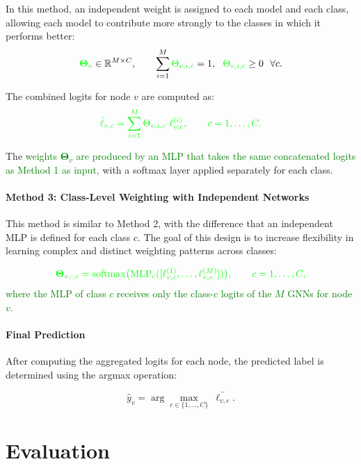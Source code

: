 \documentclass[a4paper,fleqn]{cas-sc}
\newcommand{\revthree}[1]{\textcolor{green}{#1}} %
\begin{document}
In this method, an independent weight is assigned to each model and each class, allowing each model to contribute more strongly to the classes in which it performs better:
\begin{equation}
\revthree{\mathbf{\Theta}_v}\in\mathbb{R}^{M\times C}, \qquad
\sum_{i=1}^{M}\revthree{\Theta_{v,i,c}}=1,\ \ \revthree{\Theta_{v,i,c}}\ge 0 \ \ \forall c.
\end{equation}

The combined logits for node $v$ are computed as:
\begin{equation}
\revthree{\bar{\ell}_{v,c}=\sum_{i=1}^{M}\Theta_{v,i,c}\ \ell^{(i)}_{v,c}, \qquad c=1,\dots,C.}
\end{equation}

The \revthree{weights $\mathbf{\Theta}_v$ are produced by an MLP that takes the same concatenated logits as Method 1 as input,} with a softmax layer applied separately for each class.

\paragraph{Method 3: Class-Level Weighting with Independent Networks}

This method is similar to Method 2, with the difference that an independent MLP is defined for each class $c$. The goal of this design is to increase flexibility in learning complex and distinct weighting patterns across classes:

\begin{equation}
\revthree{\mathbf{\Theta}_{v,:,c}=\mathrm{softmax}\big(\mathrm{MLP}_c([\ell^{(1)}_{v,c},\dots,\ell^{(M)}_{v,c}])\big), \qquad c=1,\dots,C,}
\end{equation}
\revthree{where the MLP of class $c$ receives only the class-$c$ logits of the $M$ GNNs for node $v$.}

\paragraph{Final Prediction}

After computing the aggregated logits for each node, the predicted label is determined using the argmax operation:

\begin{equation}
\hat{y}_v=\arg\max_{c\in\{1,\dots,C\}}\ \bar{\ell_{v,c}}.
\end{equation}

\section{Evaluation}\label{sec:Evaluation}
\end{document}
